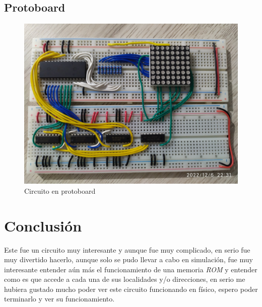 \documentclass[12pt, oneside]{article}
\begin{document}
\subsection{Protoboard}
\begin{figure}[h!]
    \centering
    \includegraphics[width=0.8\linewidth]{figs/IMG_20221206_223112.jpg}
    \caption{\sffamily Circuito en protoboard}
    \label{fig:proto}
\end{figure}

\section{Conclusión}
{\sffamily\large
    \hspace{0.5cm} Este fue un circuito muy interesante y aunque fue muy complicado, en serio fue
    muy divertido hacerlo, aunque solo se pudo llevar a cabo en simulación, fue muy interesante
    entender aún más el funcionamiento de una memoria \emph{ROM} y entender como es que accede a
    cada una de sus localidades y/o direcciones, en serio me hubiera gustado mucho poder ver este
    circuito funcionando en físico, espero poder terminarlo y ver su funcionamiento.

}
\end{document}

